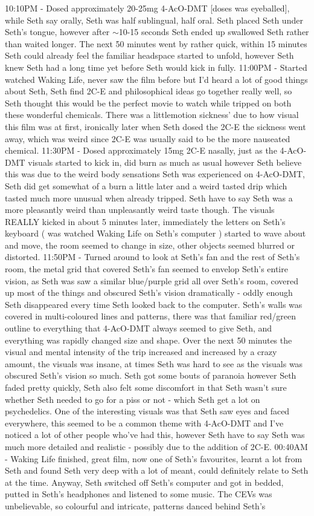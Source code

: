 \documentclass[12pt]{book}
\begin{document}
10:10PM - Dosed approximately 20-25mg 4-AcO-DMT [doses was eyeballed], while Seth say orally, Seth was half sublingual, half oral. Seth placed Seth under Seth's tongue, however after $\sim$10-15 seconds Seth ended up swallowed Seth rather than waited longer. The next 50 minutes went by rather quick, within 15 minutes Seth could already feel the familiar headspace started to unfold, however Seth knew Seth had a long time yet before Seth would kick in fully. 11:00PM - Started watched Waking Life, never saw the film before but I'd heard a lot of good things about Seth, Seth find 2C-E and philosophical ideas go together really well, so Seth thought this would be the perfect movie to watch while tripped on both these wonderful chemicals. There was a littlemotion sickness' due to how visual this film was at first, ironically later when Seth dosed the 2C-E the sickness went away, which was weird since 2C-E was usually said to be the more nauseated chemical. 11:30PM - Dosed approximately 15mg 2C-E nasally, just as the 4-AcO-DMT visuals started to kick in, did burn as much as usual however Seth believe this was due to the weird body sensations Seth was experienced on 4-AcO-DMT, Seth did get somewhat of a burn a little later and a weird tasted drip which tasted much more unusual when already tripped. Seth have to say Seth was a more pleasantly weird than unpleasantly weird taste though. The visuals REALLY kicked in about 5 minutes later, immediately the letters on Seth's keyboard ( was watched Waking Life on Seth's computer ) started to wave about and move, the room seemed to change in size, other objects seemed blurred or distorted. 11:50PM - Turned around to look at Seth's fan and the rest of Seth's room, the metal grid that covered Seth's fan seemed to envelop Seth's entire vision, as Seth was saw a similar blue/purple grid all over Seth's room, covered up most of the things and obscured Seth's vision dramatically - oddly enough Seth disappeared every time Seth looked back to the computer. Seth's walls was covered in multi-coloured lines and patterns, there was that familiar red/green outline to everything that 4-AcO-DMT always seemed to give Seth, and everything was rapidly changed size and shape. Over the next 50 minutes the visual and mental intensity of the trip increased and increased by a crazy amount, the visuals was insane, at times Seth was hard to see as the visuals was obscured Seth's vision so much. Seth got some bouts of paranoia however Seth faded pretty quickly, Seth also felt some discomfort in that Seth wasn't sure whether Seth needed to go for a piss or not - which Seth get a lot on psychedelics. One of the interesting visuals was that Seth saw eyes and faced everywhere, this seemed to be a common theme with 4-AcO-DMT and I've noticed a lot of other people who've had this, however Seth have to say Seth was much more detailed and realistic - possibly due to the addition of 2C-E. 00:40AM - Waking Life finished, great film, now one of Seth's favourites, learnt a lot from Seth and found Seth very deep with a lot of meant, could definitely relate to Seth at the time. Anyway, Seth switched off Seth's computer and got in bedded, putted in Seth's headphones and listened to some music. The CEVs was unbelievable, so colourful and intricate, patterns danced behind Seth's 
\end{document}
